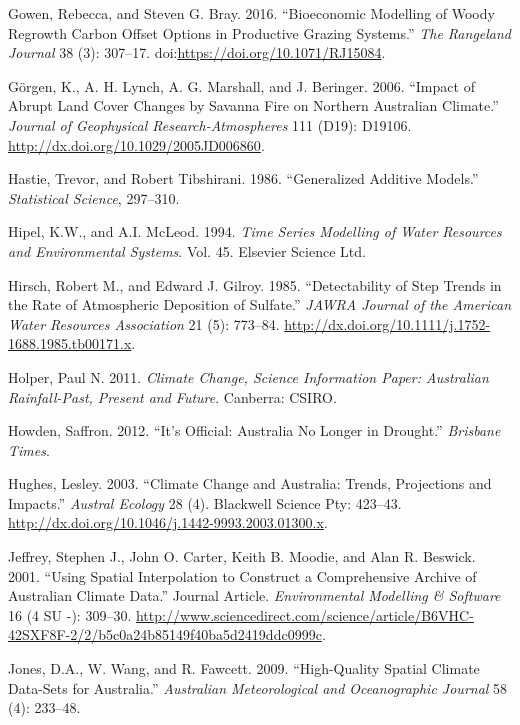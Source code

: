 \documentclass[fleqn,10pt,lineno]{wlpeerj} %
\begin{document}
\hypertarget{ref-Gowen2016}{}
Gowen, Rebecca, and Steven G. Bray. 2016. ``Bioeconomic Modelling of
Woody Regrowth Carbon Offset Options in Productive Grazing Systems.''
\emph{The Rangeland Journal} 38 (3): 307--17.
doi:\href{https://doi.org/https://doi.org/10.1071/RJ15084}{https://doi.org/10.1071/RJ15084}.

\hypertarget{ref-Gorgen2006}{}
Görgen, K., A. H. Lynch, A. G. Marshall, and J. Beringer. 2006. ``Impact
of Abrupt Land Cover Changes by Savanna Fire on Northern Australian
Climate.'' \emph{Journal of Geophysical Research-Atmospheres} 111 (D19):
D19106. \url{http://dx.doi.org/10.1029/2005JD006860}.

\hypertarget{ref-Hastie1986}{}
Hastie, Trevor, and Robert Tibshirani. 1986. ``Generalized Additive
Models.'' \emph{Statistical Science}, 297--310.

\hypertarget{ref-Hipel1994}{}
Hipel, K.W., and A.I. McLeod. 1994. \emph{Time Series Modelling of Water
Resources and Environmental Systems}. Vol. 45. Elsevier Science Ltd.

\hypertarget{ref-Hirsch1985}{}
Hirsch, Robert M., and Edward J. Gilroy. 1985. ``Detectability of Step
Trends in the Rate of Atmospheric Deposition of Sulfate.'' \emph{JAWRA
Journal of the American Water Resources Association} 21 (5): 773--84.
\url{http://dx.doi.org/10.1111/j.1752-1688.1985.tb00171.x}.

\hypertarget{ref-Holper2011}{}
Holper, Paul N. 2011. \emph{Climate Change, Science Information Paper:
Australian Rainfall-Past, Present and Future}. Canberra: CSIRO.

\hypertarget{ref-Howden2012}{}
Howden, Saffron. 2012. ``It's Official: Australia No Longer in
Drought.'' \emph{Brisbane Times}.

\hypertarget{ref-Hughes2003}{}
Hughes, Lesley. 2003. ``Climate Change and Australia: Trends,
Projections and Impacts.'' \emph{Austral Ecology} 28 (4). Blackwell
Science Pty: 423--43.
\url{http://dx.doi.org/10.1046/j.1442-9993.2003.01300.x}.

\hypertarget{ref-SILO2001}{}
Jeffrey, Stephen J., John O. Carter, Keith B. Moodie, and Alan R.
Beswick. 2001. ``Using Spatial Interpolation to Construct a
Comprehensive Archive of Australian Climate Data.'' Journal Article.
\emph{Environmental Modelling \& Software} 16 (4 SU -): 309--30.
\url{http://www.sciencedirect.com/science/article/B6VHC-42SXF8F-2/2/b5c0a24b85149f40ba5d2419ddc0999c}.

\hypertarget{ref-Jones2009}{}
Jones, D.A., W. Wang, and R. Fawcett. 2009. ``High-Quality Spatial
Climate Data-Sets for Australia.'' \emph{Australian Meteorological and
Oceanographic Journal} 58 (4): 233--48.
\end{document}
